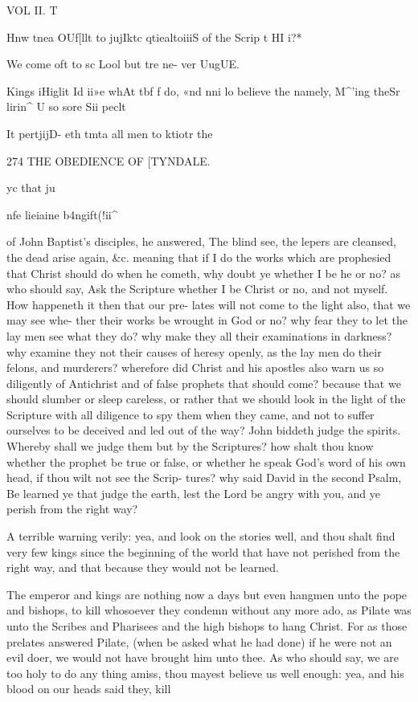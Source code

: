 \documentclass{custom}
\begin{document}
{VOL II. T 

Hnw tnea 
OUf[llt 
to jujIktc 
qtiealtoiiiS 
of the 
Scrip t HI i?* 

We come 
oft to sc Lool 
but tre ne- 
ver UugUE. 

Kings 
iHiglit Id 
ii»e whAt 
tbf f do, 
«nd nni lo 
believe the 
namely, 
M^'ing theSr 
lirin^ U so 
sore Sii%
peclt 

It pertjijD- 
eth tmta all 
men to 
ktiotr the 


274
THE OBEDIENCE OF
[TYNDALE.

yc that 
ju%

nfe lieiaine 
b4ngift(!ii^ 

of John Baptist's disciples, he answered, The blind see, the 
lepers are cleansed, the dead arise again, &c. meaning that 
if I do the works which are prophesied that Christ should 
do when he cometh, why doubt ye whether I be he or no? 
as who should say, Ask the Scripture whether I be Christ or 
no, and not myself. How happeneth it then that our pre- 
lates will not come to the light also, that we may see whe- 
ther their works be wrought in God or no? why fear they 
to let the lay men see what they do? why make they all their 
examinations in darkness? why examine they not their 
causes of heresy openly, as the lay men do their felons, and 
murderers? wherefore did Christ and his apostles also 
warn us so diligently of Antichrist and of false prophets 
that should come? because that we should slumber or 
sleep careless, or rather that we should look in the light of 
the Scripture with all diligence to spy them when they came, 
and not to suffer ourselves to be deceived and led out of the 
way? John biddeth judge the spirits. Whereby shall we 
judge them but by the Scriptures? how shalt thou know 
whether the prophet be true or false, or whether he speak 
God's word of his own head, if thou wilt not see the Scrip- 
tures? why said David in the second Psalm, Be learned ye 
that judge the earth, lest the Lord be angry with you, and 
ye perish from the right way?

A terrible warning verily: yea, and look on the stories 
well, and thou shalt find very few kings since the beginning 
of the world that have not perished from the right way, and 
that because they would not be learned. 

The emperor and kings are nothing now a days but even 
hangmen unto the pope and bishops, to kill whosoever 
they condemn without any more ado, as Pilate was unto the 
Scribes and Pharisees and the high bishops to hang Christ. 
For as those prelates answered Pilate, (when be asked 
what he had done) if he were not an evil doer, we would 
not have brought him unto thee. As who should say, we 
are too holy to do any thing amiss, thou mayest believe us 
well enough: yea, and his blood on our heads said they, kill 


}
\end{document}
